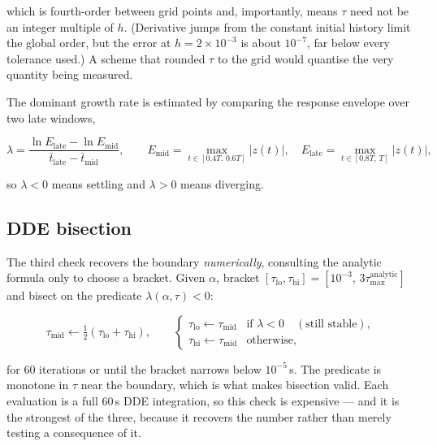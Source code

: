 \documentclass[11pt,a4paper]{article}
\theoremstyle{plain}
\theoremstyle{definition}
\begin{document}
which is fourth-order between grid points and, importantly, means
$\tau$ need not be an integer multiple of $h$. (Derivative jumps from
the constant initial history limit the global order, but the error at
$h = 2\times10^{-3}$ is about $10^{-7}$, far below every tolerance
used.) A scheme that rounded
$\tau$ to the grid would quantise the very quantity being measured.

The dominant growth rate is estimated by comparing the response envelope
over two late windows,

\begin{equation}
\lambda = \frac{\ln E_{\text{late}} - \ln E_{\text{mid}}}
               {\bar t_{\text{late}} - \bar t_{\text{mid}}},
\qquad
E_{\text{mid}} = \max_{t \in [0.4T,\,0.6T]} |z(t)|,
\quad
E_{\text{late}} = \max_{t \in [0.8T,\,T]} |z(t)| ,
\label{eq:growth}
\end{equation}

so $\lambda < 0$ means settling and $\lambda > 0$ means diverging.

\subsection{DDE bisection}
\label{sec:bisection}

The third check recovers the boundary \emph{numerically}, consulting the
analytic formula only to choose a bracket. Given $\alpha$, bracket
$[\tau_{\mathrm{lo}}, \tau_{\mathrm{hi}}] = [10^{-3},\,
3\tau_{\max}^{\text{analytic}}]$ and bisect on the predicate
$\lambda(\alpha, \tau) < 0$:

\begin{equation}
\tau_{\mathrm{mid}} \leftarrow \tfrac12(\tau_{\mathrm{lo}} + \tau_{\mathrm{hi}}),
\qquad
\begin{cases}
\tau_{\mathrm{lo}} \leftarrow \tau_{\mathrm{mid}} & \text{if } \lambda < 0
\quad (\text{still stable}),\\
\tau_{\mathrm{hi}} \leftarrow \tau_{\mathrm{mid}} & \text{otherwise},
\end{cases}
\end{equation}

for $60$ iterations or until the bracket narrows below $10^{-5}$\,s. The
predicate is monotone in $\tau$ near the boundary, which is what makes
bisection valid. Each evaluation is a full $60$\,s DDE integration, so
this check is expensive --- and it is the strongest of the three,
because it recovers the number rather than merely testing a consequence
of it.
\end{document}
